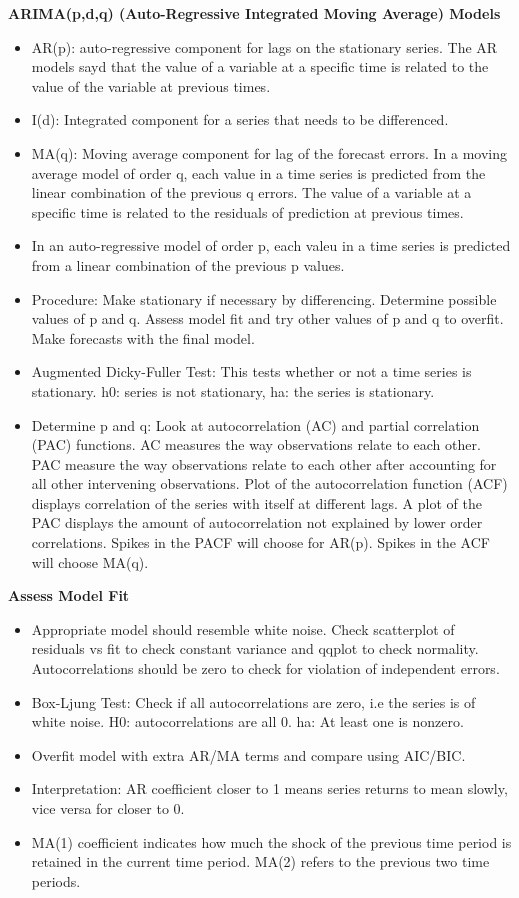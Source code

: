 \documentclass[]{book}
\theoremstyle{definition}
\theoremstyle{definition}
\theoremstyle{definition}
\theoremstyle{remark}
\begin{document}
\textbf{ARIMA(p,d,q) (Auto-Regressive Integrated Moving Average) Models}

\begin{itemize}
\item
  AR(p): auto-regressive component for lags on the stationary series.
  The AR models sayd that the value of a variable at a specific time is
  related to the value of the variable at previous times.
\item
  I(d): Integrated component for a series that needs to be differenced.
\item
  MA(q): Moving average component for lag of the forecast errors. In a
  moving average model of order q, each value in a time series is
  predicted from the linear combination of the previous q errors. The
  value of a variable at a specific time is related to the residuals of
  prediction at previous times.
\item
  In an auto-regressive model of order p, each valeu in a time series is
  predicted from a linear combination of the previous p values.
\item
  Procedure: Make stationary if necessary by differencing. Determine
  possible values of p and q. Assess model fit and try other values of p
  and q to overfit. Make forecasts with the final model.
\item
  Augmented Dicky-Fuller Test: This tests whether or not a time series
  is stationary. h0: series is not stationary, ha: the series is
  stationary.
\item
  Determine p and q: Look at autocorrelation (AC) and partial
  correlation (PAC) functions. AC measures the way observations relate
  to each other. PAC measure the way observations relate to each other
  after accounting for all other intervening observations. Plot of the
  autocorrelation function (ACF) displays correlation of the series with
  itself at different lags. A plot of the PAC displays the amount of
  autocorrelation not explained by lower order correlations. Spikes in
  the PACF will choose for AR(p). Spikes in the ACF will choose MA(q).
\end{itemize}

\textbf{Assess Model Fit}

\begin{itemize}
\item
  Appropriate model should resemble white noise. Check scatterplot of
  residuals vs fit to check constant variance and qqplot to check
  normality. Autocorrelations should be zero to check for violation of
  independent errors.
\item
  Box-Ljung Test: Check if all autocorrelations are zero, i.e the series
  is of white noise. H0: autocorrelations are all 0. ha: At least one is
  nonzero.
\item
  Overfit model with extra AR/MA terms and compare using AIC/BIC.
\item
  Interpretation: AR coefficient closer to 1 means series returns to
  mean slowly, vice versa for closer to 0.
\item
  MA(1) coefficient indicates how much the shock of the previous time
  period is retained in the current time period. MA(2) refers to the
  previous two time periods.
\end{itemize}
\end{document}
